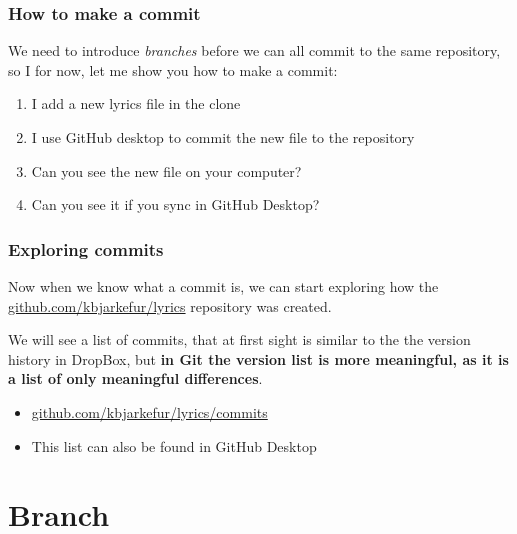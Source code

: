 \documentclass[aspectratio=169]{beamer} %
\newcommand{\trainingURL}[1]{{\color{blue}\url{#1}}}
\newcommand{\traininerUsername}{kbjarkefur}
\newcommand{\repoName}{\traininerUsername/lyrics}
\newcommand{\trainingRepoURL}[1]{\trainingURL{github.com/\repoName #1}}
\begin{document}
\begin{frame}
\frametitle{How to make a commit}

	We need to introduce \textit{branches} before we can all commit to the same repository, so I for now, let me show you how to make a commit:
	
	\begin{enumerate}
		\item I add a new lyrics file in the clone
		\item I use GitHub desktop to commit the new file to the repository
		\item Can you see the new file on your computer?
		\item Can you see it if you sync in GitHub Desktop?
	\end{enumerate}	

\end{frame}


\begin{frame}
\frametitle{Exploring commits}

	Now when we know what a commit is, we can start exploring how the \trainingRepoURL{} repository was created.
	
	\vspace{.25cm}
	
	We will see a list of commits, that at first sight is similar to the the version history in DropBox, but \textbf{in Git the version list is more meaningful, as it is a list of only meaningful differences}.

	\vspace{.25cm}
	
	\begin{itemize}
		\item \trainingRepoURL{/commits}
		\item This list can also be found in GitHub Desktop
	\end{itemize}	

\end{frame}

\section{Branch}
\end{document}
